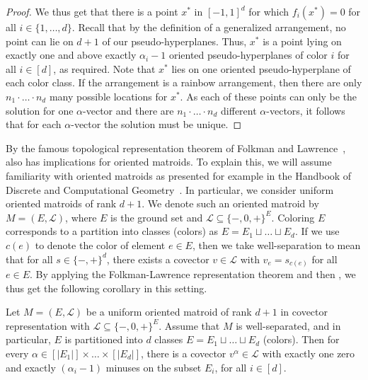 \begin{proof}
We thus get that there is a point $x^*$ in $[-1,1]^d$ for which $f_i(x^*)=0$ for all $i\in\{1,\ldots,d\}$.
Recall that by the definition of a generalized arrangement, no point can lie on $d + 1$ of our pseudo-hyperplanes. Thus, $x^*$ is a point lying on exactly one and above exactly $\alpha_i - 1$ oriented pseudo-hyperplanes of color $i$ for all $i \in [d]$, as required.
%
Note that $x^*$ lies on one oriented pseudo-hyperplane of each color class. If the arrangement is a rainbow arrangement, then there are only $n_1\cdot\ldots\cdot n_d$ many possible locations for $x^*$. As each of these points can only be the solution for one $\alpha$-vector and there are $n_1\cdot\ldots\cdot n_d$ different $\alpha$-vectors, it follows that for each $\alpha$-vector the solution must be unique.
\end{proof}
%
By the famous topological representation theorem of Folkman and Lawrence~\cite{folkmanOrientedMatroids1978},  also has implications for oriented matroids. To explain this, we will assume familiarity with oriented matroids as presented for example in the Handbook of Discrete and Computational Geometry~\cite{richter-gebertOrientedMatroids1997}. In particular, we consider uniform oriented matroids of rank $d + 1$. We denote such an oriented matroid by $M = (E, \mathcal{L})$, where $E$ is the ground set and $\mathcal{L} \subseteq \{-, 0, +\}^E$. Coloring $E$ corresponds to a partition into classes (colors) as $E = E_1 \sqcup \dots \sqcup E_d$. If we use $c(e)$ to denote the color of element $e \in E$, then we take well-separation to mean that for all $s \in \{- , + \}^d$, there exists a covector $v \in \mathcal{L}$ with $v_e = s_{c(e)}$ for all $e \in E$. By applying the Folkman-Lawrence representation theorem and then , we thus get the following corollary in this setting. 
%
\begin{corollary}\label{cor:matroids}
    Let $M = (E, \mathcal{L})$ be a uniform oriented matroid of rank $d + 1$ in covector representation with $\mathcal{L} \subseteq \{-, 0, +\}^E$. Assume that $M$ is well-separated, and in particular, $E$ is partitioned into $d$ classes $E = E_1 \sqcup \dots \sqcup E_d$ (colors). Then for every $\alpha \in [|E_1|] \times \dots \times [|E_d|]$, there is a covector $v^{\alpha} \in \mathcal{L}$ with exactly one zero and exactly $(\alpha_i - 1)$ minuses on the subset $E_i$, for all $i \in [d]$. 
\end{corollary}
%
